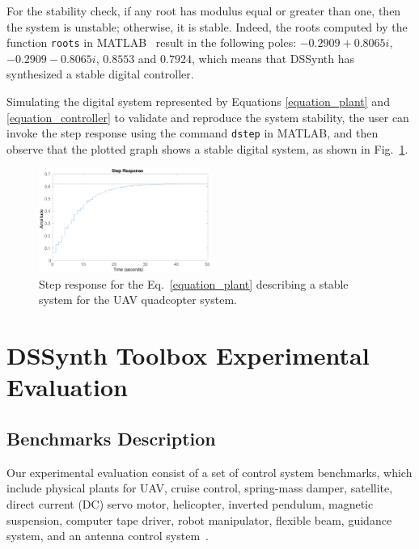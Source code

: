 \documentclass[10pt,conference]{IEEEtran}
\newcommand\tool{{DSSynth Toolbox}\xspace}
\begin{document}
For the stability check, if any root has modulus equal or greater than one, then the system is unstable; 
otherwise, it is stable. Indeed, the roots computed by the function \texttt{roots} 
in MATLAB~\cite{matlab-toolbox} result in the following poles: 
$-0.2909 + 0.8065i$, $-0.2909 - 0.8065i$, $0.8553$ and $0.7924$, 
which means that DSSynth has synthesized a stable digital controller.

Simulating the digital system represented by Equations \eqref{equation_plant} and \eqref{equation_controller} 
to validate and reproduce the system stability, the user can invoke the step response using the 
command \texttt{dstep} in MATLAB, and then observe that the plotted graph shows a stable digital system, 
as shown in Fig.~\ref{step-response}.
%
\begin{figure}[ht]
  \includegraphics[width=0.5\textwidth]{step-response.eps}
  \caption{Step response for the Eq.~\eqref{equation_plant} describing a stable system for the UAV quadcopter system.}
  \label{step-response}
\end{figure}

\section{\tool Experimental Evaluation}

\subsection{Benchmarks Description}

Our experimental evaluation consist of a set of control system benchmarks,
which include physical plants for UAV, cruise control, spring-mass damper,
satellite, direct current (DC) servo motor, helicopter, inverted pendulum,
magnetic suspension, computer tape driver, robot manipulator, flexible beam,
guidance system, and an antenna control system~\cite{abate2017, abatecav2017}.
\end{document}
